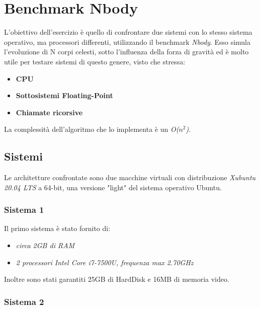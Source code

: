 \chapter{Benchmark Nbody}
L'obiettivo dell'esercizio è quello di confrontare due sistemi con lo stesso sistema operativo, ma processori differenti, utilizzando il benchmark \textit{Nbody}. Esso simula l'evoluzione di N corpi celesti, sotto l'influenza della forza di gravità ed è molto utile per testare sistemi di questo genere, visto che stressa:
\begin{itemize}
	\item \textbf{CPU}
	\item \textbf{Sottosistemi Floating-Point}
	\item \textbf{Chiamate ricorsive}
\end{itemize}
La complessità dell'algoritmo che lo implementa è un \textit{O($n^2$)}.
\section{Sistemi}
Le architetture confrontate sono due macchine virtuali con distribuzione \textit{Xubuntu 20.04 LTS} a 64-bit, una versione "light" del sistema operativo Ubuntu.
\subsection{Sistema 1}
Il primo sistema è stato fornito di:
\begin{itemize}
	\item \textit{circa 2GB di RAM}
	\item \textit{2 processori Intel Core i7-7500U, frequenza max 2.70GHz} 
\end{itemize}
Inoltre sono stati garantiti 25GB di HardDisk e 16MB di memoria video.
\subsection{Sistema 2}
